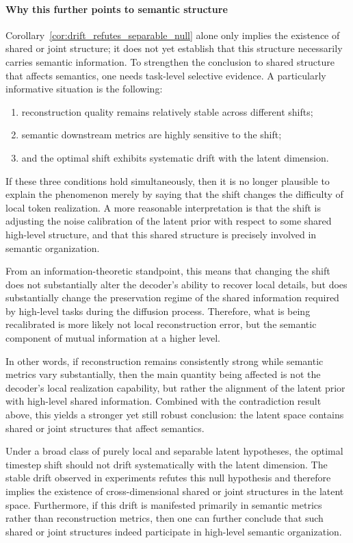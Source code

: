\paragraph{Why this further points to semantic structure}

Corollary~\ref{cor:drift_refutes_separable_null} alone only implies the existence of shared or joint structure; it does not yet establish that this structure necessarily carries semantic information. To strengthen the conclusion to shared structure that affects semantics, one needs task-level selective evidence. A particularly informative situation is the following:
\begin{enumerate}
    \item reconstruction quality remains relatively stable across different shifts;
    \item semantic downstream metrics are highly sensitive to the shift;
    \item and the optimal shift exhibits systematic drift with the latent dimension.
\end{enumerate}

If these three conditions hold simultaneously, then it is no longer plausible to explain the phenomenon merely by saying that the shift changes the difficulty of local token realization. A more reasonable interpretation is that the shift is adjusting the noise calibration of the latent prior with respect to some shared high-level structure, and that this shared structure is precisely involved in semantic organization.

From an information-theoretic standpoint, this means that changing the shift does not substantially alter the decoder's ability to recover local details, but does substantially change the preservation regime of the shared information required by high-level tasks during the diffusion process. Therefore, what is being recalibrated is more likely not local reconstruction error, but the semantic component of mutual information at a higher level.

In other words, if reconstruction remains consistently strong while semantic metrics vary substantially, then the main quantity being affected is not the decoder's local realization capability, but rather the alignment of the latent prior with high-level shared information. Combined with the contradiction result above, this yields a stronger yet still robust conclusion: the latent space contains shared or joint structures that affect semantics.

\begin{remark}
\label{rem:final_supported_claim}
Under a broad class of purely local and separable latent hypotheses, the optimal timestep shift should not drift systematically with the latent dimension. The stable drift observed in experiments refutes this null hypothesis and therefore implies the existence of cross-dimensional shared or joint structures in the latent space. Furthermore, if this drift is manifested primarily in semantic metrics rather than reconstruction metrics, then one can further conclude that such shared or joint structures indeed participate in high-level semantic organization.
\end{remark}

